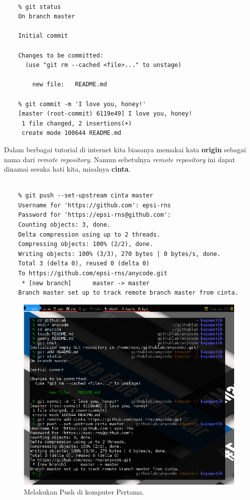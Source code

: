 \documentclass{article}
\begin{document}
\begin{lstlisting}[style=BashInputStyle]
    % git add README.md

    % git status
    On branch master

    Initial commit

    Changes to be committed:
      (use "git rm --cached <file>..." to unstage)

    	new file:   README.md

    % git commit -m 'I love you, honey!'
    [master (root-commit) 6119e49] I love you, honey!
     1 file changed, 2 insertions(+)
     create mode 100644 README.md
\end{lstlisting}

Dalam berbagai tutorial di internet kita biasanya memakai
kata \textbf{origin} sebagai nama dari \textit{remote repository}.
Namun sebetulnya \textit{remote repository} ini dapat dinamai sesuka hati kita,
misalnya \textbf{cinta}.

\begin{lstlisting}[style=BashInputStyle]
    % git remote add cinta https://github.com/epsi-rns/anycode.git

    % git push --set-upstream cinta master
    Username for 'https://github.com': epsi-rns
    Password for 'https://epsi-rns@github.com': 
    Counting objects: 3, done.
    Delta compression using up to 2 threads.
    Compressing objects: 100% (2/2), done.
    Writing objects: 100% (3/3), 270 bytes | 0 bytes/s, done.
    Total 3 (delta 0), reused 0 (delta 0)
    To https://github.com/epsi-rns/anycode.git
     * [new branch]      master -> master
    Branch master set up to track remote branch master from cinta.
\end{lstlisting}

\begin{figure}[H]
  \includegraphics[width=\linewidth]{gitcli-first-process-account.png}
  \caption{Melakukan Push di komputer Pertama.}
  \label{fig:git.first}
\end{figure}
\end{document}
